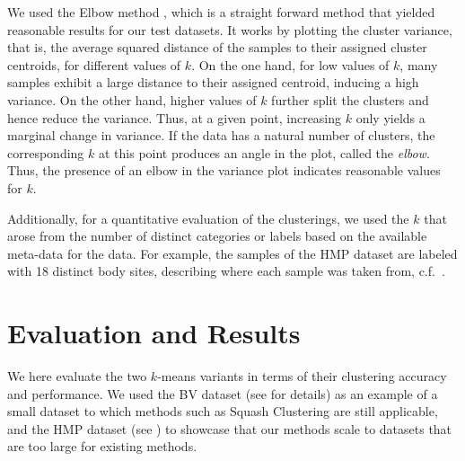 We used the Elbow method \cite{Thorndike1953},
which is a straight forward method that yielded reasonable results for our test datasets.
It works by plotting the cluster variance,
that is, the average squared distance of the samples to their assigned cluster centroids,
for different values of $k$.
On the one hand, for low values of $k$, many samples exhibit a large distance to their assigned centroid,
inducing a high variance.
On the other hand, higher values of $k$ further split the clusters and hence reduce the variance.
Thus, at a given point, increasing $k$ only yields a marginal change in variance.
If the data has a natural number of clusters, the corresponding $k$ at this point produces an angle in the plot,
called the \emph{elbow}.
Thus, the presence of an elbow in the variance plot indicates reasonable values for $k$.

Additionally, for a quantitative evaluation of the clusterings,
we used the $k$ that arose from the number of distinct categories or labels based on the available meta-data for the data.
For example, the samples of the \ac{HMP} dataset are labeled with \num{18} distinct body sites,
describing where each sample was taken from, c.f.~.


\section{Evaluation and Results}
\label{ch:Clustering:sec:Results}

We here evaluate the two $k$-means variants in terms of their clustering accuracy and performance.
We used the \acf{BV} dataset (see  for details)
as an example of a small dataset to which methods such as Squash Clustering \cite{Matsen2011a} are still applicable,
and the \acf{HMP} dataset (see )
to showcase that our methods scale to datasets that are too large for existing methods.


